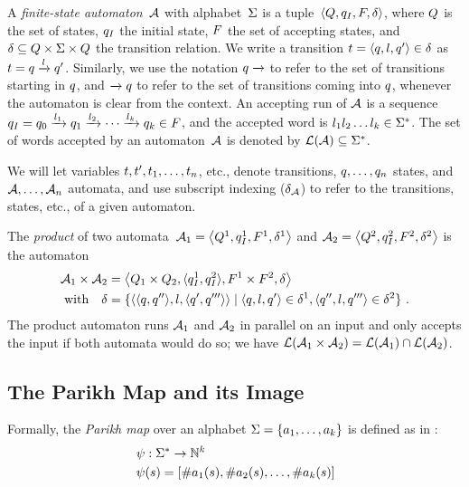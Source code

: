 A \emph{finite-state automaton}~$\mathcal{A}$ with alphabet~$\Sigma$ is a
tuple~$\left\langle Q, q_I, F, \delta\right\rangle$, where $Q$ is the set of states,
$q_I$ the initial state, $F$ the set of
accepting states, and
$\delta \subseteq Q \times \Sigma \times Q$ the
transition relation.  We write a transition
$t = \left\langle q, l, q'\right\rangle \in \delta$ as
$t = q \xrightarrow{l} q'$.  Similarly, we
use the notation $q \xrightarrow{}$ to refer to the set of
transitions starting in $q$, and $\xrightarrow{} q$ to
refer to the set of transitions coming into $q$, whenever the
automaton is clear from the context. An accepting run of $\mathcal{A}$
is a sequence
$q_I = q_0 \xrightarrow{l_1} q_1 \xrightarrow{l_2} \cdots
\xrightarrow{l_k} q_k \in F$, and the accepted word is
$l_1 l_2 \ldots l_k \in \Sigma^*$. The set of words accepted by an
automaton~$\mathcal{A}$ is denoted by
$\operatorname{\mathcal{L}}(\mathcal{A}) \subseteq \Sigma^*$.

We will let variables $t, t', t_1, \ldots,
t_n$, etc., denote transitions, $q, \ldots, q_n$ states, and
$\mathcal{A}, \ldots, \mathcal{A}_n$ automata, and use subscript indexing
($\delta_{\mathcal{A}}$) to refer to the transitions, states, etc., of a given
automaton.

The \emph{product} of two
automata~$\mathcal{A}_1 = \left\langle Q^1, q_I^1,
  F^1, \delta^1\right\rangle$ and
$\mathcal{A}_2 = \left\langle Q^2, q_I^2,
  F^2, \delta^2\right\rangle$ is the automaton
\begin{align*}
\mathcal{A}_1 \times \mathcal{A}_2 &=
\left\langle Q_1 \times Q_2, \langle q_I^1, q_I^2\rangle,
F^1 \times F^2,
  \delta\right\rangle\\
  \text{with}\quad \delta &= \{\langle\langle q,q''\rangle, l, \langle q',q'''\rangle\rangle \mid \langle q, l, q'\rangle \in \delta^1, \langle q'', l, q'''\rangle \in \delta^2\}~.
\end{align*}
The product automaton runs $\mathcal{A}_1$ and $\mathcal{A}_2$ in
parallel on an input and only accepts the input if both automata would
do so; we have $\operatorname{\mathcal{L}}(\mathcal{A}_1 \times \mathcal{A}_2) =
\operatorname{\mathcal{L}}(\mathcal{A}_1) \cap \operatorname{\mathcal{L}}(\mathcal{A}_2)$.

\subsection{The Parikh Map and its Image}
Formally, the \textit{Parikh map} over an alphabet $\Sigma=
\left\{a_1, \ldots, a_k \right\}$ is defined as in \cite{kozen}:
$$
\begin{aligned}
& \operatorname{\psi}: \Sigma^* \rightarrow \mathbb{N}^k \\
& \operatorname{\psi}(s) = \left[{\#a_1(s), \#a_2(s), \ldots, \#a_k(s)}\right]
\end{aligned}
$$

